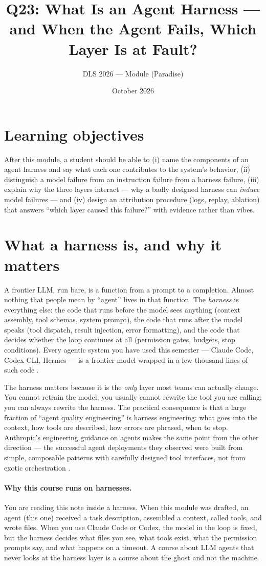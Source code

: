 \documentclass[11pt]{article}
\title{Q23: What Is an Agent Harness --- and When the Agent Fails, Which Layer Is at Fault?}
\author{DLS 2026 --- Module (Paradise)}
\date{October 2026}
\begin{document}
\maketitle

\section*{Learning objectives}
After this module, a student should be able to (i) name the components of an agent harness and say what each one contributes to the system's behavior, (ii) distinguish a model failure from an instruction failure from a harness failure, (iii) explain why the three layers interact --- why a badly designed harness can \emph{induce} model failures --- and (iv) design an attribution procedure (logs, replay, ablation) that answers ``which layer caused this failure?'' with evidence rather than vibes.

\section{What a harness is, and why it matters}
A frontier LLM, run bare, is a function from a prompt to a completion. Almost nothing that people mean by ``agent'' lives in that function. The \emph{harness} is everything else: the code that runs before the model sees anything (context assembly, tool schemas, system prompt), the code that runs after the model speaks (tool dispatch, result injection, error formatting), and the code that decides whether the loop continues at all (permission gates, budgets, stop conditions). Every agentic system you have used this semester --- Claude Code, Codex CLI, Hermes --- is a frontier model wrapped in a few thousand lines of such code \cite{schluntz2024building}.

The harness matters because it is the \emph{only} layer most teams can actually change. You cannot retrain the model; you usually cannot rewrite the tool you are calling; you can always rewrite the harness. The practical consequence is that a large fraction of ``agent quality engineering'' is harness engineering: what goes into the context, how tools are described, how errors are phrased, when to stop. Anthropic's engineering guidance on agents makes the same point from the other direction --- the successful agent deployments they observed were built from simple, composable patterns with carefully designed tool interfaces, not from exotic orchestration \cite{schluntz2024building}.

\paragraph{Why this course runs on harnesses.} You are reading this note inside a harness. When this module was drafted, an agent (this one) received a task description, assembled a context, called tools, and wrote files. When you use Claude Code or Codex, the model in the loop is fixed, but the harness decides what files you see, what tools exist, what the permission prompts say, and what happens on a timeout. A course about LLM agents that never looks at the harness layer is a course about the ghost and not the machine.
\end{document}
